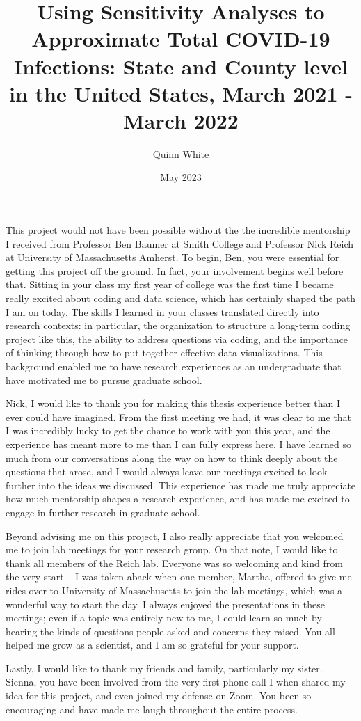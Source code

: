 \documentclass[12pt,twoside]{smiththesis}
\title{Using Sensitivity Analyses to Approximate Total COVID-19 Infections: State and County level in the United States, March 2021 - March 2022}
\author{Quinn White}
\date{May 2023}
\begin{document}
  \maketitle

\frontmatter %
\pagestyle{empty} %
  \begin{acknowledgements}
    This project would not have been possible without the the incredible mentorship I received from Professor Ben Baumer at Smith College and Professor Nick Reich at University of Massachusetts Amherst. To begin, Ben, you were essential for getting this project off the ground. In fact, your involvement begins well before that. Sitting in your class my first year of college was the first time I became really excited about coding and data science, which has certainly shaped the path I am on today. The skills I learned in your classes translated directly into research contexts: in particular, the organization to structure a long-term coding project like this, the ability to address questions via coding, and the importance of thinking through how to put together effective data visualizations. This background enabled me to have research experiences as an undergraduate that have motivated me to pursue graduate school.

    Nick, I would like to thank you for making this thesis experience better than I ever could have imagined. From the first meeting we had, it was clear to me that I was incredibly lucky to get the chance to work with you this year, and the experience has meant more to me than I can fully express here. I have learned so much from our conversations along the way on how to think deeply about the questions that arose, and I would always leave our meetings excited to look further into the ideas we discussed. This experience has made me truly appreciate how much mentorship shapes a research experience, and has made me excited to engage in further research in graduate school.

    Beyond advising me on this project, I also really appreciate that you welcomed me to join lab meetings for your research group. On that note, I would like to thank all members of the Reich lab. Everyone was so welcoming and kind from the very start -- I was taken aback when one member, Martha, offered to give me rides over to University of Massachusetts to join the lab meetings, which was a wonderful way to start the day. I always enjoyed the presentations in these meetings; even if a topic was entirely new to me, I could learn so much by hearing the kinds of questions people asked and concerns they raised. You all helped me grow as a scientist, and I am so grateful for your support.

    Lastly, I would like to thank my friends and family, particularly my sister. Sienna, you have been involved from the very first phone call I when shared my idea for this project, and even joined my defense on Zoom. You been so encouraging and have made me laugh throughout the entire process.
  \end{acknowledgements}
\end{document}
